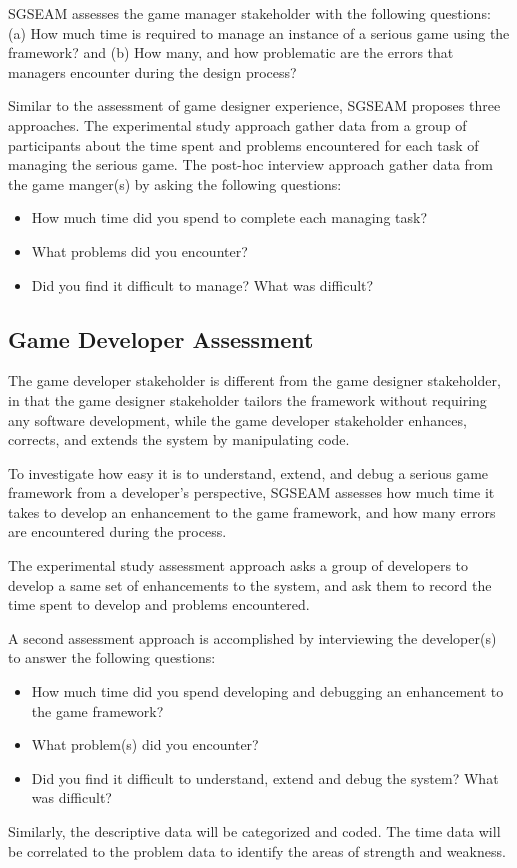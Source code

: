 \documentclass[11pt]{article}
\begin{document}
SGSEAM assesses the game manager stakeholder with the following questions: (a) How much time is
required to manage an instance of a serious game using the framework? and (b) How many,
and how problematic are the errors that managers encounter during the design process?

Similar to the assessment of game designer experience, SGSEAM proposes three approaches. The
experimental study approach gather data from a group of participants about the time spent and
problems encountered for each task of managing the serious game. The post-hoc interview approach
gather data from the game manger(s) by asking the following questions:

\begin{itemize}
\item How much time did you spend to complete each managing task?
\item What problems did you encounter?
\item Did you find it difficult to manage? What was difficult?
\end{itemize}

\subsection{Game Developer Assessment}

The game developer stakeholder is different from the game designer stakeholder, in that the
game designer stakeholder tailors the framework without requiring any software
development, while the game developer stakeholder enhances, corrects, and extends the system by
manipulating code. 

To investigate how easy it is to understand, extend, and debug a serious game
framework from a developer's perspective, SGSEAM assesses how much time it takes to develop an
enhancement to the game framework, and how many errors are encountered
during the process.

The experimental study assessment approach asks a group of developers to develop a same set of
enhancements to the system, and ask them to record the time spent to develop and problems
encountered.

A second assessment approach is accomplished by interviewing the developer(s) to
answer the following questions:

\begin{itemize}
\item How much time did you spend developing and debugging an
  enhancement to the game framework?
\item What problem(s) did you encounter?
\item Did you find it difficult to understand, extend and debug the
  system? What was difficult?
\end{itemize}

Similarly, the descriptive data will be categorized and coded. The time data will be correlated to the problem data to identify the areas of strength and weakness.



\end{document}
